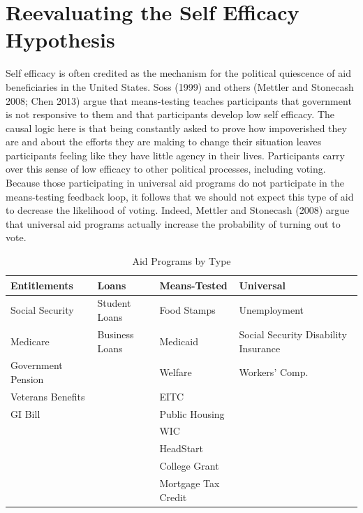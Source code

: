\documentclass[12pt]{paper}
\begin{document}
\section{Reevaluating the Self Efficacy Hypothesis}
Self efficacy is often credited as the mechanism for the political quiescence of aid beneficiaries in the United States. Soss (1999) and others (Mettler and Stonecash 2008; Chen 2013) argue that means-testing teaches participants that government is not responsive to them and that participants develop low self efficacy. The causal logic here is that being constantly asked to prove how impoverished they are and about the efforts they are making to change their situation leaves participants feeling like they have little agency in their lives. Participants carry over this sense of low efficacy to other political processes, including voting. Because those participating in universal aid programs do not participate in the means-testing feedback loop, it follows that we should not expect this type of aid to decrease the likelihood of voting. Indeed, Mettler and Stonecash (2008) argue that universal aid programs actually increase the probability of turning out to vote.

\begin{table}[H]
	\begin{adjustbox}{width=1\textwidth}
		\begin{tabular}{llll}
			\hline
			\textbf{Entitlements} & \textbf{Loans} & \textbf{Means-Tested} & \textbf{Universal}                   \\ \hline
			Social Security       & Student Loans  & Food Stamps           & Unemployment                         \\
			Medicare              & Business Loans & Medicaid              & Social Security Disability Insurance \\
			Government Pension    &                & Welfare               & Workers' Comp.                       \\
			Veterans Benefits     &                & EITC                  &                                      \\
			GI Bill               &                & Public Housing        &                                      \\
			&                & WIC                   &                                      \\
			&                & HeadStart             &                                      \\
			&                & College Grant         &                                      \\
			&                & Mortgage Tax Credit   &                                      \\ \hline
		\end{tabular}
	\end{adjustbox}
	\caption{Aid Programs by Type} 
	\label{}
\end{table}
\end{document}
